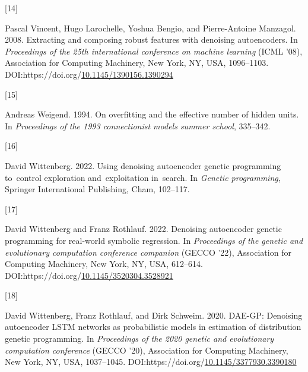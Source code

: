 \documentclass[
  11pt,
]{article}
\newlength{\cslhangindent}
\newlength{\csllabelwidth}
\newlength{\cslentryspacingunit} %
\newenvironment{CSLReferences}[2] %
 {%
  \setlength{\parindent}{0pt}
  \ifodd #1
  \let\oldpar\par
  \def\par{\hangindent=\cslhangindent\oldpar}
  \fi
  \setlength{\parskip}{#2\cslentryspacingunit}
 }%
 {}
\newcommand{\CSLLeftMargin}[1]{\parbox[t]{\csllabelwidth}{#1}}
\newcommand{\CSLRightInline}[1]{\parbox[t]{\linewidth - \csllabelwidth}{#1}\break}
\begin{document}
\begin{CSLReferences}{0}{0}
\leavevmode{}%
\CSLLeftMargin{{[}14{]} }%
\CSLRightInline{Pascal Vincent, Hugo Larochelle, Yoshua Bengio, and
Pierre-Antoine Manzagol. 2008. Extracting and composing robust features
with denoising autoencoders. In \emph{Proceedings of the 25th
international conference on machine learning} (ICML '08), Association
for Computing Machinery, New York, NY, USA, 1096--1103.
DOI:https://doi.org/\href{https://doi.org/10.1145/1390156.1390294}{10.1145/1390156.1390294}}

\leavevmode{}%
\CSLLeftMargin{{[}15{]} }%
\CSLRightInline{Andreas Weigend. 1994. On overfitting and the effective
number of hidden units. In \emph{Proceedings of the 1993 connectionist
models summer school}, 335--342.}

\leavevmode{}%
\CSLLeftMargin{{[}16{]} }%
\CSLRightInline{David Wittenberg. 2022. Using denoising autoencoder
genetic programming to~control exploration and~exploitation in~search.
In \emph{Genetic programming}, Springer International Publishing, Cham,
102--117.}

\leavevmode{}%
\CSLLeftMargin{{[}17{]} }%
\CSLRightInline{David Wittenberg and Franz Rothlauf. 2022. Denoising
autoencoder genetic programming for real-world symbolic regression. In
\emph{Proceedings of the genetic and evolutionary computation conference
companion} (GECCO '22), Association for Computing Machinery, New York,
NY, USA, 612--614.
DOI:https://doi.org/\href{https://doi.org/10.1145/3520304.3528921}{10.1145/3520304.3528921}}

\leavevmode{}%
\CSLLeftMargin{{[}18{]} }%
\CSLRightInline{David Wittenberg, Franz Rothlauf, and Dirk Schweim.
2020. DAE-GP: Denoising autoencoder LSTM networks as probabilistic
models in estimation of distribution genetic programming. In
\emph{Proceedings of the 2020 genetic and evolutionary computation
conference} (GECCO '20), Association for Computing Machinery, New York,
NY, USA, 1037--1045.
DOI:https://doi.org/\href{https://doi.org/10.1145/3377930.3390180}{10.1145/3377930.3390180}}

\end{CSLReferences}
\end{document}
